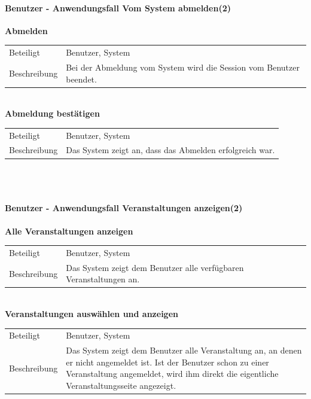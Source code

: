 \documentclass[12pt,a4paper]{article}
\begin{document}
\paragraph{Benutzer - Anwendungsfall \glqq Vom System abmelden\grqq (2)}\mbox{}

\textbf{Abmelden}\\
\begin{tabular}{l|p{12cm}}
\hline 
Beteiligt & Benutzer, System \\ 
Beschreibung & Bei der Abmeldung vom System wird die Session vom Benutzer beendet.\\ 
\end{tabular}\\

\textbf{Abmeldung bestätigen}\\
\begin{tabular}{l|p{12cm}}
\hline 
Beteiligt & Benutzer, System \\ 
Beschreibung &  Das System zeigt an, dass das Abmelden erfolgreich war. \\ 
\end{tabular}\\\\



\paragraph{Benutzer - Anwendungsfall \glqq Veranstaltungen anzeigen\grqq (2)}\mbox{}

\textbf{Alle Veranstaltungen anzeigen}\\
\begin{tabular}{l|p{12cm}}
\hline 
Beteiligt & Benutzer, System  \\ 
Beschreibung & Das System zeigt dem Benutzer alle verfügbaren Veranstaltungen an. \\ 
\end{tabular}\\ 

\textbf{Veranstaltungen auswählen und anzeigen}\\
\begin{tabular}{l|p{12cm}}
\hline 
Beteiligt & Benutzer, System \\ 
Beschreibung & Das System zeigt dem Benutzer alle Veranstaltung an, an denen er nicht angemeldet ist. Ist der Benutzer schon zu einer Veranstaltung angemeldet, wird ihm direkt die eigentliche Veranstaltungsseite angezeigt. \\ 
\end{tabular} \\\\
\end{document}
